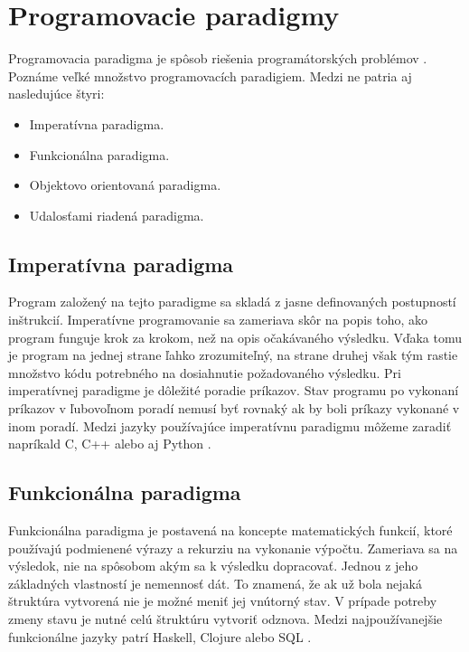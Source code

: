 \section{Programovacie paradigmy}
\noindent \par
Programovacia paradigma je spôsob riešenia programátorských problémov \cite{samuelInsightProgrammingParadigms2018}.
Poznáme veľké množstvo programovacích paradigiem. Medzi ne patria aj nasledujúce štyri:
\begin{itemize}
  \item Imperatívna paradigma.
  \item Funkcionálna paradigma.
  \item Objektovo orientovaná paradigma.
  \item Udalosťami riadená paradigma.
\end{itemize}

\subsection{Imperatívna paradigma}
\noindent \par
Program založený na tejto paradigme sa skladá z jasne definovaných postupností inštrukcií. Imperatívne programovanie sa zameriava skôr na popis toho, ako program funguje krok za krokom,
než na opis očakávaného výsledku. Vďaka tomu je program na jednej strane ľahko zrozumiteľný, na strane druhej však tým rastie množstvo kódu potrebného na dosiahnutie požadovaného výsledku.
Pri imperatívnej paradigme je dôležité poradie príkazov. Stav programu po vykonaní príkazov v ľubovoľnom poradí nemusí byť rovnaký ak by boli príkazy
vykonané v inom poradí. Medzi jazyky používajúce imperatívnu paradigmu môžeme zaradiť napríkald C, C++ alebo aj Python \cite{imperativParadigm}.

\subsection{Funkcionálna paradigma}
\noindent \par
Funkcionálna paradigma je postavená na koncepte matematických funkcií, ktoré používajú podmienené
výrazy a rekurziu na vykonanie výpočtu. Zameriava sa na výsledok, nie na spôsobom akým
sa k výsledku dopracovať. Jednou z jeho základných vlastností je nemennosť dát. To
znamená, že ak už bola nejaká štruktúra vytvorená nie je možné meniť jej vnútorný stav.
V prípade potreby zmeny stavu je nutné celú štruktúru vytvoriť odznova. Medzi
najpoužívanejšie funkcionálne jazyky patrí Haskell, Clojure alebo SQL \cite{martinWhatFunctionalProgramming2020}.

